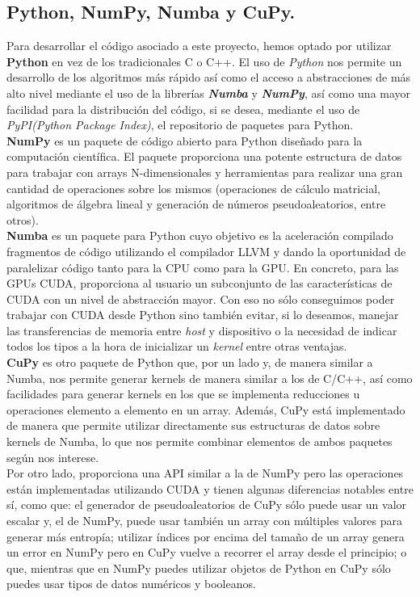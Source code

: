 \subsection{Python, NumPy, Numba y CuPy.}
Para desarrollar el código asociado a este proyecto, hemos optado por utilizar \textbf{Python} en vez de los tradicionales C o C++. El uso de \textit{Python} nos permite un desarrollo de los algoritmos más rápido así como el acceso a abstracciones de más alto nivel mediante el uso de la librerías \textbf{\textit{Numba}} y \textbf{\textit{NumPy}},  así como una mayor facilidad para la distribución del código, si se desea, mediante el uso de \textit{PyPI(Python Package Index)}, el repositorio de paquetes para Python. \\

\textbf{NumPy} \cite{numpy} es un paquete de código abierto para Python diseñado para la computación científica. El paquete proporciona una potente estructura de datos para trabajar con arrays N-dimensionales y herramientas para realizar una gran cantidad de operaciones sobre los mismos (operaciones de cálculo matricial, algoritmos de álgebra lineal y generación de números pseudoaleatorios, entre otros).\\

\textbf{Numba} \cite{numba} es un paquete para Python cuyo objetivo es la aceleración compilado fragmentos de código utilizando el compilador LLVM y dando la oportunidad de paralelizar código tanto para la CPU como para la GPU. En concreto, para las GPUs CUDA, proporciona al usuario un subconjunto de las características de CUDA con un nivel de abstracción mayor. Con eso no sólo conseguimos poder trabajar con CUDA desde Python sino también evitar, si lo deseamos, manejar las transferencias de memoria entre \textit{host} y dispositivo o la necesidad de indicar todos los tipos a la hora de inicializar un \textit{kernel} entre otras ventajas.\\

\textbf{CuPy} \cite{cupy} es otro paquete de Python que, por un lado y, de manera similar a Numba, nos permite generar kernels de manera similar a los de C/C++, así como facilidades para generar kernels en los que se implementa reducciones u operaciones elemento a elemento en un array. Además, CuPy está implementado de manera que permite utilizar directamente sus estructuras de datos sobre kernels de Numba, lo que nos permite combinar elementos de ambos paquetes según nos interese. \\

Por otro lado, proporciona una API similar a la de NumPy pero las operaciones están implementadas utilizando CUDA y tienen algunas diferencias notables entre sí, como que: el generador de pseudoaleatorios de CuPy sólo puede usar un valor escalar y, el de NumPy, puede usar también un array con múltiples valores para generar más entropía; utilizar índices por encima del tamaño de un array genera un error en NumPy pero en CuPy vuelve a recorrer el array desde el principio; o que, mientras que en NumPy puedes utilizar objetos de Python en CuPy sólo puedes usar tipos de datos numéricos y booleanos.\\

